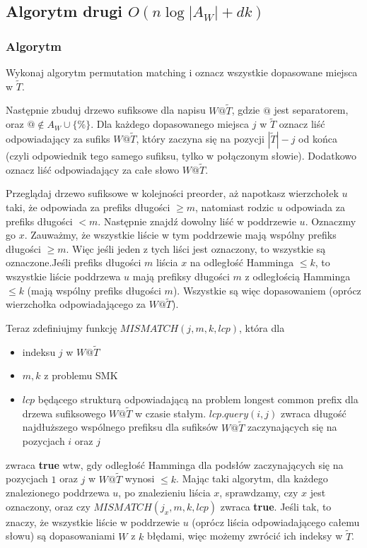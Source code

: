 \documentclass[a4paper,11pt]{article}
\begin{document}
\subsection{Algorytm drugi $O(n\log|A_W| +dk)$}
\subsubsection{Algorytm}
Wykonaj algorytm permutation matching i oznacz wszystkie dopasowane miejsca w $\tilde{T}$.
\par
Następnie zbuduj drzewo sufiksowe dla napisu $W@\tilde{T}$, gdzie $@$ jest separatorem, oraz $@\notin A_W\cup \{\%\}$. Dla każdego dopasowanego miejsca $j$ w $\tilde{T}$ oznacz liść odpowiadający za sufiks $W@\tilde{T}$, który zaczyna się na pozycji $|\tilde{T}|-j$ od końca (czyli odpowiednik tego samego sufiksu, tylko w połączonym słowie). Dodatkowo oznacz liść odpowiadający za całe słowo $W@\tilde{T}$.
\par
Przeglądaj drzewo sufiksowe w kolejności preorder, aż napotkasz wierzchołek $u$ taki, że odpowiada za prefiks długości $\geq m$, natomiast rodzic $u$ odpowiada za prefiks długości $< m$. Następnie znajdź dowolny liść w poddrzewie $u$. Oznaczmy go $x$. Zauważmy, że wszystkie liście w tym poddrzewie mają wspólny prefiks długości $\geq m$. Więc jeśli jeden z tych liści jest oznaczony, to wszystkie są oznaczone.Jeśli prefiks długości $m$ liścia $x$ na odległość Hamminga $\leq k$, to wszystkie liście poddrzewa $u$ mają prefiksy długości $m$ z odległością Hamminga $\leq k$ (mają wspólny prefiks długości $m$). Wszystkie są więc dopasowaniem (oprócz wierzchołka odpowiadającego za $W@\tilde{T}$).
\par
Teraz zdefiniujmy funkcję $MISMATCH(j, m, k, lcp)$, która dla
\begin{itemize}
    \item indeksu $j$ w $W@\tilde{T}$
    \item $m,k$ z problemu SMK
    \item $lcp$ będącego strukturą odpowiadającą na problem longest common prefix dla drzewa sufiksowego $W@\tilde{T}$ w czasie stałym. $lcp.query(i,j)$ zwraca długość najdłuższego wspólnego prefiksu dla sufiksów $W@\tilde{T}$ zaczynających się na pozycjach $i$ oraz $j$
\end{itemize}
zwraca \textbf{true} wtw, gdy odległość Hamminga dla podsłów zaczynających się na pozycjach $1$ oraz $j$ w $W@\tilde{T}$ wynosi $\leq k$. Mając taki algorytm, dla każdego znalezionego poddrzewa $u$, po znalezieniu liścia $x$, sprawdzamy, czy $x$ jest oznaczony, oraz czy $MISMATCH(j_x,m,k,lcp)$ zwraca \textbf{true}. Jeśli tak, to znaczy, że wszystkie liście w poddrzewie $u$ (oprócz liścia odpowiadającego całemu słowu) są dopasowaniami $W$ z $k$ błędami, więc możemy zwrócić ich indeksy w $\tilde{T}$.
\end{document}
